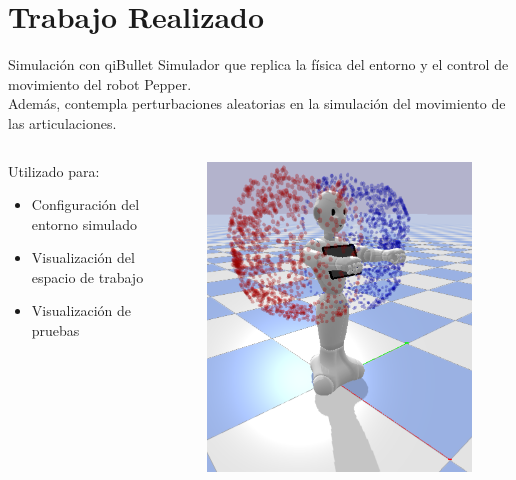 \documentclass[spanish,10pt]{beamer}
\begin{document}
	\section{Trabajo Realizado}
	\begin{frame}{Simulación con qiBullet}
		Simulador que replica la física del entorno y el control de movimiento del robot Pepper.\\[1em]
		
		Además, contempla perturbaciones aleatorias en la simulación del movimiento de las articulaciones.
		
		\begin{columns}
			\begin{column}{0.6\textwidth}
				Utilizado para:
				\begin{itemize}
					\item Configuración del entorno simulado
					\item Visualización del espacio de trabajo
					\item Visualización de pruebas
				\end{itemize}
			\end{column}
			
			\begin{column}{0.4\textwidth}
				\begin{figure}[h!]
					\centering
					\includegraphics[width=\textwidth]{images/metodologia/workspace}
				\end{figure}
			\end{column}
		\end{columns}
	\end{frame}
	
\end{document}
